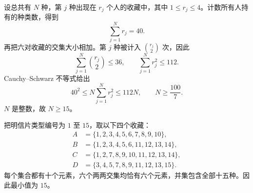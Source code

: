 设总共有 $N$ 种，第 $j$ 种出现在 $r_j$ 个人的收藏中，其中 $1\le r_j\le4$。计数所有人持有的种类数，得到
\[
 \sum_{j=1}^N r_j=40.
\]
再把六对收藏的交集大小相加。第 $j$ 种被计入 $\binom{r_j}{2}$ 次，因此
\[
 \sum_{j=1}^N\binom{r_j}{2}\le36,
 \qquad \sum_{j=1}^N r_j^2\le112.
\]
Cauchy--Schwarz 不等式给出
\[
 40^2\le N\sum_{j=1}^N r_j^2\le112N,
 \qquad N\ge\frac{100}{7}.
\]
$N$ 是整数，故 $N\ge15$。

把明信片类型编号为 $1$ 至 $15$，取以下四个收藏：
\[
 \begin{aligned}
 A&=\{1,2,3,4,5,6,7,8,9,10\},\\
 B&=\{1,2,3,4,5,6,11,12,13,14\},\\
 C&=\{1,2,7,8,9,10,11,12,13,14\},\\
 D&=\{3,4,5,7,8,9,11,12,13,15\}.
 \end{aligned}
\]
每个集合都有十个元素，六个两两交集均恰有六个元素，并集包含全部十五种。因此最小值为 $\boxed{15}$。
